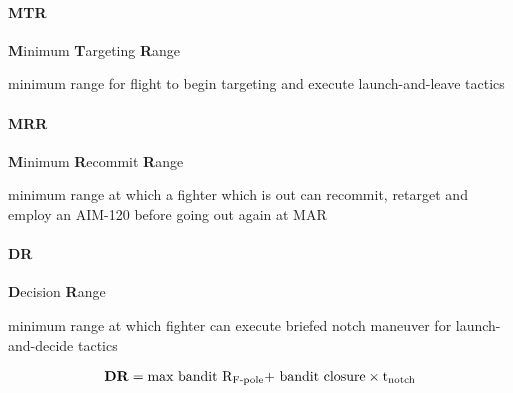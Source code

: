 \paragraph{MTR} 
\textbf{M}inimum \textbf{T}argeting \textbf{R}ange

\medskip
minimum range for flight to begin targeting and execute launch-and-leave tactics

\paragraph{MRR} 
\textbf{M}inimum \textbf{R}ecommit \textbf{R}ange

\medskip
minimum range at which a fighter which is out can recommit, 
retarget and employ an AIM-120 before going out again at MAR

\paragraph{DR} 
\textbf{D}ecision \textbf{R}ange

\medskip
minimum range at which fighter can execute briefed notch maneuver for launch-and-decide tactics

\begin{align*}
    \text{\textbf{DR}} =
    \text{max bandit R\textsubscript{F-pole}}
    \text{+ bandit closure} 
    \times \text{t\textsubscript{notch}}
\end{align*}

